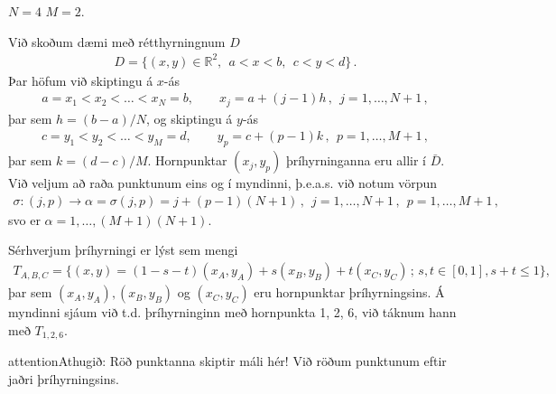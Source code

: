 \documentclass[a4paper,10pt,icelandic]{sphinxmanual}
\begin{document}


 \(N=4\)  \(M=2\).

Við skoðum dæmi með rétthyrningnum \(D\)
\begin{equation*}
\begin{split}D=\{ (x,y)\in \mathbb{R}^2, ~~ a<x<b, ~~ c<y<d\}\,.\end{split}
\end{equation*}
Þar höfum við skiptingu á \(x\)-ás
\begin{equation*}
\begin{split}a=x_1 < x_2 < \dots < x_N= b, \qquad x_j= a+ (j-1)h \,,~~ j=1, \dots, N+1\,,\end{split}
\end{equation*}
þar sem \(h=(b-a)/N\), og skiptingu á \(y\)-ás
\begin{equation*}
\begin{split}c=y_1 < y_2 < \dots < y_M= d, \qquad y_p= c+ (p-1)k \,,~~ p=1, \dots, M+1\,,\end{split}
\end{equation*}
þar sem \(k=(d-c)/M\). Hornpunktar \((x_j, y_p)\) þríhyrninganna eru allir í \(\bar D\).
Við veljum að raða punktunum eins og í myndinni, þ.e.a.s. við notum vörpun
\begin{equation*}
\begin{split}\sigma: (j, p) \to \alpha= \sigma(j,p)= j+(p-1)(N+1)\,, ~~ j=1, \dots, N+1\,,~~p=1, \dots, M+1\,,\end{split}
\end{equation*}
svo er \(\alpha=1, \dots, (M+1)(N+1)\).

Sérhverjum þríhyrningi er lýst sem mengi
\begin{equation*}
\begin{split}T_{A,B,C}=\{(x,y)=(1-s-t)(x_A,y_A)+s(x_B,y_B)+t(x_{C},y_{C})
\,;\, s,t\in [0,1], s+t\leq 1\},\end{split}
\end{equation*}
þar sem \((x_A,y_A), (x_B,y_B)\) og \((x_C,y_C)\) eru hornpunktar þríhyrningsins. Á myndinni sjáum við  t.d. þríhyrninginn með hornpunkta 1, 2, 6, við táknum hann með \(T_{1,2,6}\).

\begin{sphinxadmonition}{attention}{Athugið:}
Röð punktanna skiptir máli hér! Við röðum punktunum  eftir jaðri þríhyrningsins.
\end{sphinxadmonition}
\end{document}
